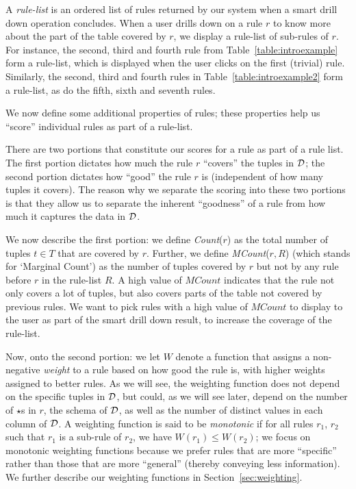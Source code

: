 A {\em rule-list} is an ordered list of rules returned by our system when a smart drill down operation concludes. 
When a user drills down on a rule $r$ to know more about the part of the table covered by $r$, we display a rule-list of sub-rules of $r$.
For instance, the second, third and fourth rule from Table~\ref{table:introexample} form a rule-list, which is displayed when the user clicks on the first (trivial) rule. Similarly, the second, third and fourth rules in Table~\ref{table:introexample2} form a rule-list, as do the fifth, sixth and seventh rules. 

 We now define some additional properties of rules; these properties
help us ``score'' individual rules as part of a rule-list. 

There are two portions that constitute our scores for a rule as part of a rule list. 
The first portion dictates how much the rule $r$ ``covers'' the tuples in $\mathcal{D}$;
the second portion dictates how ``good'' the rule $r$ is (independent of how many
tuples it covers). 
The reason why we separate the scoring into these two portions is
that they allow us to separate the inherent ``goodness'' of a rule from
how much it captures the data in $\mathcal{D}$.

We now describe the first portion:
we define {\em Count}($r$) as the total number of tuples $t \in T$ that are covered by $r$. 
Further, we define {\em MCount}($r, R$) (which stands for `Marginal Count') as the number of tuples covered by $r$ but not by any rule before $r$ in the rule-list $R$. A high value of $MCount$ indicates that the rule not only covers a lot of tuples, but also covers parts of the table not covered by previous rules. We want to pick rules with a high value of $MCount$ to display to the user
as part of the smart drill down result, to increase the coverage of the rule-list. 

Now, onto the second portion: we let $W$ denote a function that assigns a non-negative {\em weight} to a rule based on how good the rule is, with higher weights assigned to better rules. 
As we will see, the weighting function does not depend on the specific
tuples in $\mathcal{D}$, but could, as we will see later, 
depend on the number of $\star$s in $r$,
the schema of $\mathcal{D}$, 
as well as the number of distinct values in each column of $\mathcal{D}$.
A weighting function is said to be {\em monotonic} if for all rules $r_1$, $r_2$ such that $r_1$ is a sub-rule of $r_2$, we have $W(r_1) \leq W(r_2)$; we focus
on monotonic weighting functions because we prefer 
rules that are more ``specific''
rather than those that are more ``general'' 
(thereby conveying less information).
We further describe our weighting functions in Section~\ref{sec:weighting}. 


